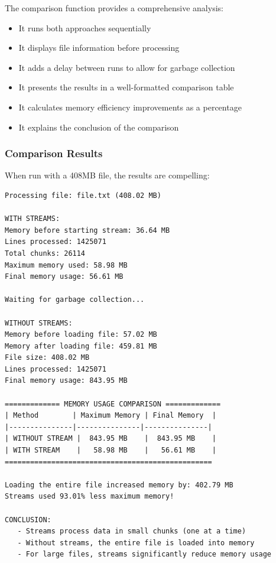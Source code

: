\documentclass[12pt,letterpaper]{article}
\newenvironment{macterminal}{%
    \begin{mdframed}[
        linecolor=terminalFrame,
        backgroundcolor=terminalBg,
        roundcorner=5pt,
        skipabove=5pt,
        skipbelow=5pt,
        linewidth=1pt,
        innertopmargin=5pt,
        frametitle={%
            \tikz[baseline=(current bounding box.east), outer sep=0pt]{
                \fill[red!80!black] (0,0) circle (5pt);
                \fill[yellow!80!black] (0.7,0) circle (5pt);
                \fill[green!70!black] (1.4,0) circle (5pt);
            }
        },
        frametitlealignment=\raggedright,
        frametitleaboveskip=8pt,
        frametitlebelowskip=0pt,
    ]
}{%
    \end{mdframed}%
}
\begin{document}
The comparison function provides a comprehensive analysis:
\begin{itemize}
    \item It runs both approaches sequentially
    \item It displays file information before processing
    \item It adds a delay between runs to allow for garbage collection
    \item It presents the results in a well-formatted comparison table
    \item It calculates memory efficiency improvements as a percentage
    \item It explains the conclusion of the comparison
\end{itemize}

\subsubsection{Comparison Results}

When run with a 408MB file, the results are compelling:

\begin{macterminal}
\begin{lstlisting}
Processing file: file.txt (408.02 MB)

WITH STREAMS:
Memory before starting stream: 36.64 MB
Lines processed: 1425071
Total chunks: 26114
Maximum memory used: 58.98 MB
Final memory usage: 56.61 MB

Waiting for garbage collection...

WITHOUT STREAMS:
Memory before loading file: 57.02 MB
Memory after loading file: 459.81 MB
File size: 408.02 MB
Lines processed: 1425071
Final memory usage: 843.95 MB

============= MEMORY USAGE COMPARISON =============
| Method        | Maximum Memory | Final Memory  |
|---------------|---------------|---------------|
| WITHOUT STREAM |  843.95 MB    |  843.95 MB    |
| WITH STREAM    |   58.98 MB    |   56.61 MB    |
=================================================

Loading the entire file increased memory by: 402.79 MB
Streams used 93.01% less maximum memory!

CONCLUSION:
   - Streams process data in small chunks (one at a time)
   - Without streams, the entire file is loaded into memory
   - For large files, streams significantly reduce memory usage
\end{lstlisting}
\end{macterminal}
\end{document}
